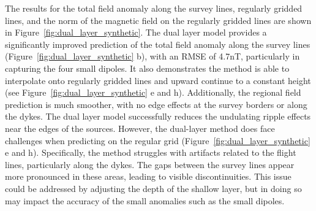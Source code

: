 The results for the total field anomaly along the survey lines, regularly gridded lines, and the norm of the magnetic field on the regularly gridded lines are shown in Figure~\ref{fig:dual_layer_synthetic}. The dual layer model provides a significantly improved prediction of the total field anomaly along the survey lines (Figure~\ref{fig:dual_layer_synthetic} b), with an RMSE of 4.7nT, particularly in capturing the four small dipoles. It also demonstrates the method is able to interpolate onto regularly gridded lines and upward continue to a constant height (see Figure~\ref{fig:dual_layer_synthetic} e and h). Additionally, the regional field prediction is much smoother, with no edge effects at the survey borders or along the dykes. The dual layer model successfully reduces the undulating ripple effects near the edges of the sources. However, the dual-layer method does face challenges when predicting on the regular grid (Figure~\ref{fig:dual_layer_synthetic} e and h). Specifically, the method struggles with artifacts related to the flight lines, particularly along the dykes. The gaps between the survey lines appear more pronounced in these areas, leading to visible discontinuities. This issue could be addressed by adjusting the depth of the shallow layer, but in doing so may impact the accuracy of the small anomalies such as the small dipoles.
